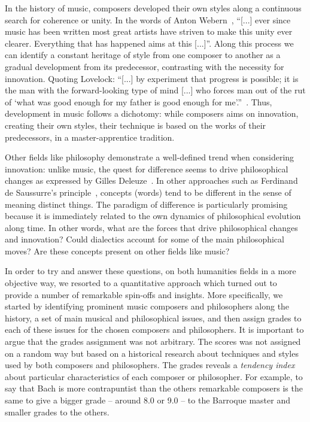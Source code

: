 \documentclass[
 aip,
 jmp,
 amsmath,amssymb,
 reprint,
]{revtex4-1}
\begin{document}
In the history of music, composers developed their own styles along a
continuous search for coherence or unity. In the words of Anton
Webern~\cite{Webern}, ``[...] ever since music has been written most great artists
have striven to make this unity ever clearer. Everything that has
happened aims at this [...]''. Along this process we can identify
a constant heritage of style from one composer to another as
a gradual development from its
predecessor, contrasting with the necessity for innovation. Quoting
Lovelock: 
``[...] by experiment that progress is possible; it is the man
with the forward-looking type of mind [...] who forces man out of the
rut of `what was good enough for my father is good enough for me'.''~\cite{Lovelock}.
Thus, development in music follows a dichotomy: while composers aims on
innovation, creating their own styles, their technique is based on the
works of their predecessors, in a master-apprentice tradition.

Other fields like philosophy demonstrate
a well-defined trend when considering innovation: unlike music, the
quest for difference seems to drive philosophical
changes as expressed by Gilles Deleuze~\cite{Deleuze}. In other approaches such as Ferdinand de
Saussurre's principle~\cite{Saussure}, concepts (words) tend
to be different in the sense of meaning distinct things.  The paradigm
of difference is particularly promising because it is immediately
related to the own dynamics of philosophical evolution along time.  In
other words, what are the forces that drive philosophical changes and
innovation?  Could dialectics account for some of the main
philosophical moves? Are these concepts present on other fields like music?

In order to try and answer these questions, on both humanities fields in a more objective way, we resorted to a quantitative approach which turned out to provide a number of remarkable spin-offs and insights. More specifically, we
started by identifying prominent music composers and philosophers along the history, a set of main musical and philosophical issues, and then
assign grades to each of these issues for the chosen composers and philosophers. It is important to argue that the grades assignment was not arbitrary. The scores was not assigned on a random way but based on a historical research about techniques and styles used by both composers and philosophers. The grades reveals a \emph{tendency index} about particular characteristics of each composer or philosopher. For example, to say that Bach is more contrapuntist than the others remarkable composers is the same to give a bigger grade -- around 8.0 or 9.0 -- to the Barroque master and smaller grades to the others.
\end{document}
